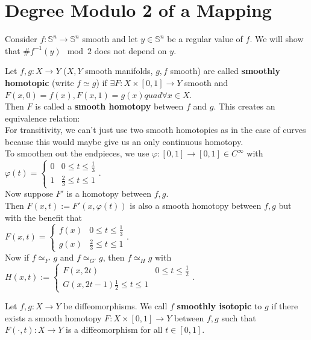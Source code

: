 \section{Degree Modulo 2 of a Mapping}
Consider $f:\mathbb{S}^n\to\mathbb{S}^n$ smooth and let $y\in \mathbb{S}^n$ be a regular value of $f$. We will show that $\# f^{-1}(y) \mod 2$ does not depend on $y$. 
\begin{definition}\label{8.1}
    Let $f,g: X\to Y$ ($X,Y$ smooth manifolds, $g,f$ smooth) are called \textbf{smoothly homotopic} (write $f\simeq g$) if $\exists F:X\times[0,1]\to Y$ smooth and $F(x,0)=f(x), F(x,1)=g(x)quad \forall x\in X$.\\
    Then $F$ is called a \textbf{smooth homotopy} between $f$ and $g$. This creates an equivalence relation:\\
    For transitivity, we can't just use two smooth homotopies as in the case of curves because this would maybe give us an only continuous homotopy.\\
    To smoothen out the endpieces, we use $\varphi:[0,1]\to[0,1]\in C^\infty$ with \\
    $\varphi(t)=\begin{cases}
        0 & 0\leq t\leq \frac{1}{3}\\
        1 & \frac{2}{3}\leq t\leq 1
    \end{cases}$. \\
    Now suppose $F'$ is a homotopy between $f,g$.\\
    Then $F(x,t):=F'(x,\varphi(t))$ is also a smooth homotopy between $f,g$ but with the benefit that \\
    $F(x,t)=\begin{cases}
        f(x) & 0\leq t \leq \frac{1}{3}\\
        g(x) & \frac{2}{3}\leq t\leq 1
    \end{cases}$.\\
    Now if $f\simeq_{F'} g$ and $f\simeq_{G'}g$, then $f\simeq_{H} g$ with \\
    $H(x,t):=\begin{cases}
        F(x,2t) & 0\leq t\leq\frac{1}{2}\\
        G(x,2t-1) \frac{1}{2}\leq t\leq 1
    \end{cases}$.
\end{definition}
\begin{definition}\label{8.2}
    Let $f,g:X\to Y$ be diffeomorphisms. We call $f$ \textbf{smoothly isotopic} to $g$ if there exists a smooth homotopy $F:X\times[0,1]\to Y$ between $f,g$ such that $F(\cdot,t):X\to Y$ is a diffeomorphism for all $t\in[0,1]$.
\end{definition}
